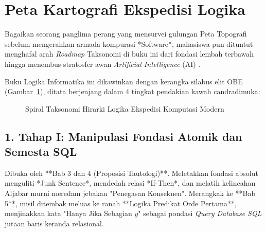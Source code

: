 \section{Peta Kartografi Ekspedisi Logika}

Bagaikan seorang panglima perang yang mensurvei gulungan Peta Topografi sebelum mengerahkan armada kompurasi *Software*, mahasiswa pun dituntut menghafal arah \textit{Roadmap} Taksonomi di buku ini dari fondasi lembah terbawah hingga menembus stratosfer awan \textit{Artificial Intelligence} (AI) \cite{openlogic,levin_discrete}.

Buku Logika Informatika ini dikawinkan dengan kerangka silabus elit OBE (Gambar~\ref{fig:peta-konsep}), ditata berjenjang dalam 4 tingkat pendakian kawah candradimuka:

\begin{figure}[htbp]
\centering
{}
\caption{Spiral Taksonomi Hirarki Logika Ekspedisi Komputasi Modern}
\label{fig:peta-konsep}
\end{figure}

\subsection{1. Tahap I: Manipulasi Fondasi Atomik dan Semesta SQL}
Dibuka oleh **Bab 3 dan 4 (Proposisi Tautologi)**. Meletakkan fondasi absolut menguliti *Junk Sentence*, mendedah relasi *If-Then*, dan melatih kelincahan Aljabar murni meredam jebakan "Penegasan Konsekuen". Merangkak ke **Bab 5**, misil ditembak meluas ke ranah **Logika Predikat Orde Pertama**, menjinakkan kata "Hanya Jika Sebagian $y$" sebagai pondasi \textit{Query Database SQL} jutaan baris keranda relasional.

